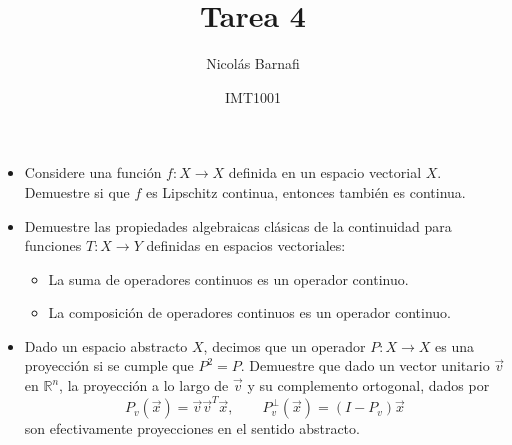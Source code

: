 \documentclass[9pt]{article}
\title{Tarea 4}
\author{Nicolás Barnafi}
\date{IMT1001}
\newcommand{\R}{\mathbb{R}}
\begin{document}
\maketitle
{}

\begin{itemize}
    \item{} Considere una función $f:X\to X$ definida en un espacio vectorial $X$. Demuestre si que $f$ es Lipschitz continua, entonces también es continua.
    \item Demuestre las propiedades algebraicas clásicas de la continuidad para funciones $T:X\to Y$ definidas en espacios vectoriales: 
            \begin{itemize}
                \item{} La suma de operadores continuos es un operador continuo. 
                \item {} La composición de operadores continuos es un operador continuo.
            \end{itemize}
    \item{} Dado un espacio abstracto $X$, decimos que un operador $P:X\to X$ es una proyección si se cumple que $P^2 = P$. Demuestre que dado un vector unitario $\vec v$ en $\R^n$, la proyección a lo largo de $\vec v$ y su complemento ortogonal, dados por
            $$ P_v(\vec x) = \vec v\vec v^T \vec x, \qquad P_v^\perp(\vec x) = (I - P_v)\vec x$$
            son efectivamente proyecciones en el sentido abstracto. 


\end{itemize}
\end{document}
